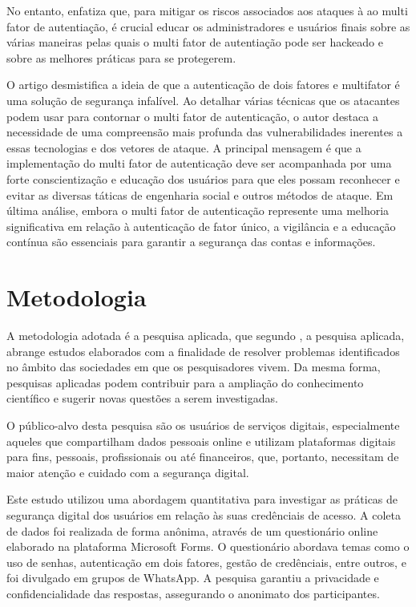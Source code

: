 \documentclass[12pt]{article}
\begin{document}
No entanto, \cite{article:3} enfatiza que, para mitigar os riscos associados aos ataques à
ao multi fator de autentiação, é crucial educar os administradores e usuários finais sobre
as várias maneiras pelas quais o multi fator de autentiação pode ser hackeado e sobre as
melhores práticas para se protegerem.

O artigo \cite{article:3} desmistifica a ideia de que a autenticação de dois fatores e
multifator é uma solução de segurança infalível.
Ao detalhar várias técnicas que os atacantes podem usar para contornar o multi fator de
autenticação, o autor destaca a necessidade de uma compreensão mais profunda das
vulnerabilidades inerentes a essas tecnologias e dos vetores de ataque.
A principal mensagem é que a implementação do multi fator de autenticação deve ser
acompanhada por uma forte conscientização e educação dos usuários para que eles possam
reconhecer e evitar as diversas táticas de engenharia social e outros métodos de ataque.
Em última análise, embora o multi fator de autenticação represente uma melhoria
significativa em relação à autenticação de fator único, a vigilância e a educação
contínua são essenciais para garantir a segurança das contas e informações.

\section{Metodologia}

A metodologia adotada é a pesquisa aplicada, que segundo \cite{book:1}, a
pesquisa aplicada, abrange estudos elaborados com a finalidade de resolver
problemas identificados no âmbito das sociedades em que os pesquisadores
vivem.
Da mesma forma, pesquisas aplicadas podem contribuir para a ampliação do
conhecimento científico e sugerir novas questões a serem investigadas.

O público-alvo desta pesquisa são os usuários de serviços digitais,
especialmente aqueles que compartilham dados pessoais online e utilizam
plataformas digitais para fins, pessoais, profissionais ou até financeiros,
que, portanto, necessitam de maior atenção e cuidado com a segurança digital.

Este estudo utilizou uma abordagem quantitativa para investigar as práticas
de segurança digital dos usuários em relação às suas credênciais de acesso.
A coleta de dados foi realizada de forma anônima, através de um questionário
online elaborado na plataforma Microsoft Forms.
O questionário abordava temas como o uso de senhas, autenticação em dois
fatores, gestão de credênciais, entre outros, e foi divulgado em grupos de
WhatsApp.
A pesquisa garantiu a privacidade e confidencialidade das respostas,
assegurando o anonimato dos participantes.
\end{document}
